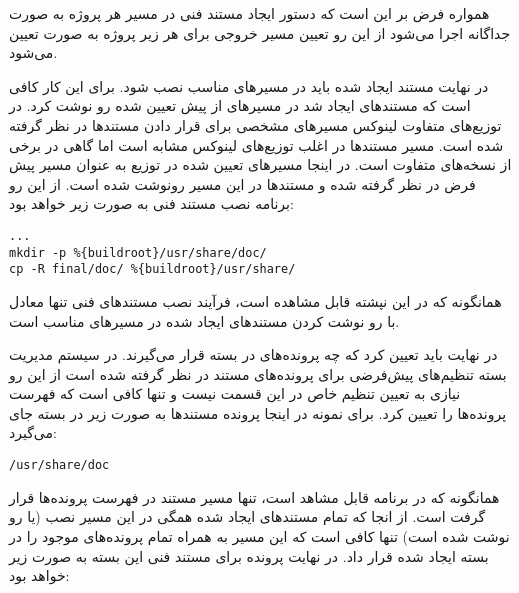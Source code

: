 \begin{note}
همواره فرض بر این است که دستور ایجاد مستند فنی در مسیر هر پروژه به صورت جداگانه
اجرا می‌شود از این رو تعیین مسیر خروجی برای هر زیر پروژه به صورت
 تعیین می‌شود.
\end{note}

در نهایت مستند ایجاد شده باید در مسیرهای مناسب نصب شود. برای این کار کافی است که
مستندهای ایجاد شد در مسیرهای از پیش تعیین شده رو نوشت کرد. در توزیع‌های متفاوت
لینوکس مسیرهای مشخصی برای قرار دادن مستندها در نظر گرفته شده است. مسیر مستندها
در اغلب توزیع‌های لینوکس مشابه است اما گاهی در برخی از نسخه‌های متفاوت است. در
اینجا مسیرهای تعیین شده در توزیع  به عنوان مسیر پیش فرض در نظر
گرفته شده و مستندها در این مسیر رونوشت شده است. از این رو برنامه نصب مستند فنی
به صورت زیر خواهد بود:

\begin{latin}
\lstset{language=TeX}  
\begin{lstlisting}[frame=single] 
%install
...
mkdir -p %{buildroot}/usr/share/doc/
cp -R final/doc/ %{buildroot}/usr/share/
\end{lstlisting}
\end{latin}

همانگونه که در این نپشته قابل مشاهده است، فرآیند نصب مستندهای فنی تنها معادل با
رو نوشت کردن مستندهای ایجاد شده در مسیرهای مناسب است. 

در نهایت باید تعیین کرد که چه پرونده‌های در بسته قرار می‌گیرند. در سیستم مدیریت
بسته  تنظیم‌های پیش‌فرضی برای پرونده‌های مستند در نظر گرفته شده است از
این رو نیازی به تعیین تنظیم خاص در این قسمت نیست و تنها کافی است که فهرست
پرونده‌ها را تعیین کرد. برای نمونه در اینجا پرونده مستندها به صورت زیر در بسته
جای می‌گیرد:

\begin{latin}
\lstset{language=TeX}  
\begin{lstlisting}[frame=single] 
%docdir /usr/share/doc
/usr/share/doc
\end{lstlisting}
\end{latin}

همانگونه که در برنامه قابل مشاهد است، تنها مسیر مستند در فهرست پرونده‌ها
قرار گرفت است. از انجا که تمام مستندهای ایجاد شده همگی در این مسیر نصب (یا رو
نوشت شده است) تنها کافی است که این مسیر به همراه تمام پرونده‌های موجود را در
بسته ایجاد شده قرار داد. در نهایت پرونده  برای مستند فنی این بسته به
صورت زیر خواهد بود:


